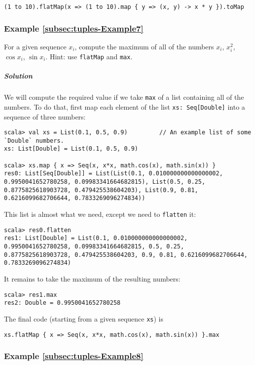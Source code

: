 \begin{lstlisting}
(1 to 10).flatMap(x => (1 to 10).map { y => (x, y) -> x * y }).toMap
\end{lstlisting}


\subsubsection{Example \label{subsec:tuples-Example7}\ref{subsec:tuples-Example7}}

For a given sequence $x_{i}$, compute the maximum of all of the numbers
$x_{i}$, $x_{i}^{2}$, $\cos x_{i}$, $\sin x_{i}$. Hint: use \lstinline!flatMap!
and \lstinline!max!.

\subparagraph{Solution}

We will compute the required value if we take \lstinline!max! of
a list containing all of the numbers. To do that, first map each element
of the list \lstinline!xs: Seq[Double]! into a sequence of three
numbers:
\begin{lstlisting}
scala> val xs = List(0.1, 0.5, 0.9)         // An example list of some `Double` numbers.
xs: List[Double] = List(0.1, 0.5, 0.9)

scala> xs.map { x => Seq(x, x*x, math.cos(x), math.sin(x)) }
res0: List[Seq[Double]] = List(List(0.1, 0.010000000000000002, 0.9950041652780258, 0.09983341664682815), List(0.5, 0.25, 0.8775825618903728, 0.479425538604203), List(0.9, 0.81, 0.6216099682706644, 0.7833269096274834))
\end{lstlisting}
This list is almost what we need, except we need to \lstinline!flatten!
it:
\begin{lstlisting}
scala> res0.flatten
res1: List[Double] = List(0.1, 0.010000000000000002, 0.9950041652780258, 0.09983341664682815, 0.5, 0.25, 0.8775825618903728, 0.479425538604203, 0.9, 0.81, 0.6216099682706644, 0.7833269096274834) 
\end{lstlisting}
It remains to take the maximum of the resulting numbers:
\begin{lstlisting}
scala> res1.max
res2: Double = 0.9950041652780258
\end{lstlisting}
The final code (starting from a given sequence \lstinline!xs!) is

\begin{lstlisting}
xs.flatMap { x => Seq(x, x*x, math.cos(x), math.sin(x)) }.max
\end{lstlisting}


\subsubsection{Example \label{subsec:tuples-Example8}\ref{subsec:tuples-Example8}}

